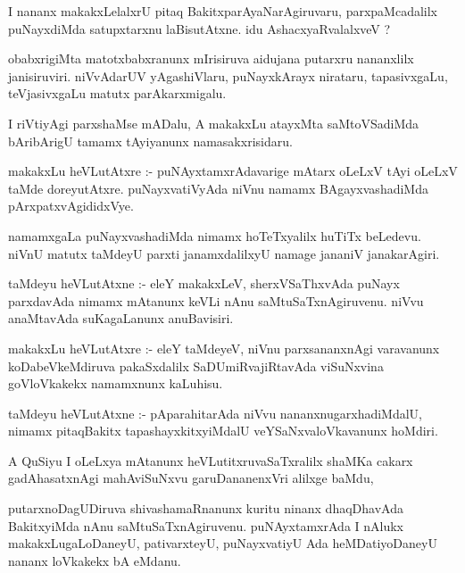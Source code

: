 \documentclass{article}
\begin{document}
\begin{mn}
I nananx makakxLelalxrU pitaq BakitxparAyaNarAgiruvaru, parxpaMcadalilx
puNayxdiMda satupxtarxnu laBisutAtxne.  idu AshacxyaRvalalxveV ?
\end{mn}

\begin{mn}
obabxrigiMta matotxbabxranunx mIrisiruva aidujana putarxru nananxlilx 
janisiruviri. niVvAdarUV yAgashiVlaru, puNayxkArayx nirataru,
tapasivxgaLu, teVjasivxgaLu matutx parAkarxmigalu.
\end{mn}

\begin{mn}
I riVtiyAgi parxshaMse mADalu, A makakxLu atayxMta saMtoVSadiMda 
bAribArigU tamamx tAyiyanunx namasakxrisidaru.
\end{mn}

\begin{mn}
makakxLu heVLutAtxre :- puNAyxtamxrAdavarige mAtarx oLeLxV tAyi oLeLxV 
taMde doreyutAtxre. puNayxvatiVyAda niVnu namamx BAgayxvashadiMda
pArxpatxvAgididxVye.
\end{mn}

\begin{mn}
namamxgaLa puNayxvashadiMda nimamx hoTeTxyalilx huTiTx beLedevu. niVnU 
matutx taMdeyU parxti janamxdalilxyU namage jananiV janakarAgiri.
\end{mn}

\begin{mn}
taMdeyu heVLutAtxne :- eleY makakxLeV, sherxVSaThxvAda puNayx parxdavAda 
nimamx mAtanunx keVLi nAnu saMtuSaTxnAgiruvenu. niVvu anaMtavAda 
suKagaLanunx anuBavisiri.  
\end{mn}

\begin{mn}
makakxLu heVLutAtxre :- eleY taMdeyeV, niVnu parxsananxnAgi varavanunx
koDabeVkeMdiruva pakaSxdalilx SaDUmiRvajiRtavAda viSuNxvina goVloVkakekx 
namamxnunx kaLuhisu.
\end{mn}

\begin{mn}
taMdeyu heVLutAtxne :- pAparahitarAda niVvu nananxnugarxhadiMdalU, nimamx 
pitaqBakitx  tapashayxkitxyiMdalU veYSaNxvaloVkavanunx hoMdiri.
\end{mn}

\begin{mn}
A QuSiyu I oLeLxya mAtanunx heVLutitxruvaSaTxralilx shaMKa cakarx 
gadAhasatxnAgi mahAviSuNxvu garuDananenxVri alilxge baMdu,
\end{mn}

\begin{mn}
putarxnoDagUDiruva shivashamaRnanunx kuritu ninanx dhaqDhavAda BakitxyiMda 
nAnu saMtuSaTxnAgiruvenu. puNAyxtamxrAda I nAlukx makakxLugaLoDaneyU, 
pativarxteyU, puNayxvatiyU Ada  heMDatiyoDaneyU nananx loVkakekx bA eMdanu.
\end{mn}
\end{document}
